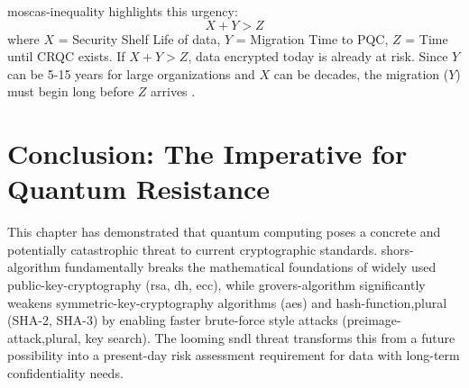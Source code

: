 \Gls{moscas-inequality} highlights this urgency:
\begin{equation}
    X + Y > Z
\end{equation}
where $X$ = Security Shelf Life of data, $Y$ = Migration Time to PQC, $Z$ = Time until CRQC exists. If $X+Y > Z$, data encrypted today is already at risk. Since $Y$ can be 5-15 years for large organizations and $X$ can be decades, the migration ($Y$) must begin long before $Z$ arrives \parencite{mosca2018cybersecurity}.


\section{Conclusion: The Imperative for Quantum Resistance}\label{sec:conclusion_ch5_rev}

This chapter has demonstrated that quantum computing poses a concrete and potentially catastrophic threat to current cryptographic standards. \Gls{shors-algorithm} fundamentally breaks the mathematical foundations of widely used \gls{public-key-cryptography} (\gls{rsa}, \gls{dh}, \gls{ecc}), while \gls{grovers-algorithm} significantly weakens \gls{symmetric-key-cryptography} algorithms (\gls{aes}) and \gls{hash-function,plural} (SHA-2, SHA-3) by enabling faster brute-force style attacks (\gls{preimage-attack,plural}, key search). The looming \gls{sndl} threat transforms this from a future possibility into a present-day risk assessment requirement for data with long-term confidentiality needs.



